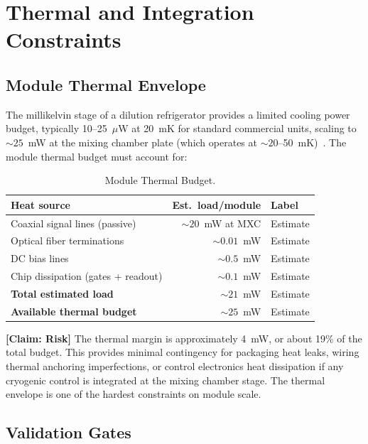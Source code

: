 \documentclass[conference]{IEEEtran}
\begin{document}
\section{Thermal and Integration Constraints}

\subsection{Module Thermal Envelope}

The millikelvin stage of a dilution refrigerator provides a limited cooling power budget, typically 10--25~$\mu$W at 20~mK for standard commercial units, scaling to ${\sim}25$~mW at the mixing chamber plate (which operates at ${\sim}20$--50~mK)~\cite{krinner2019}. The module thermal budget must account for:

\begin{table}[htbp]
\centering
\caption{Module Thermal Budget.}
\label{tab:thermal}
\begin{tabular}{lrl}
\toprule
\textbf{Heat source} & \textbf{Est.\ load/module} & \textbf{Label} \\
\midrule
Coaxial signal lines (passive) & ${\sim}20$~mW at MXC & Estimate \\
Optical fiber terminations & ${\sim}0.01$~mW & Estimate \\
DC bias lines & ${\sim}0.5$~mW & Estimate \\
Chip dissipation (gates + readout) & ${\sim}0.1$~mW & Estimate \\
\textbf{Total estimated load} & ${\sim}21$~mW & Estimate \\
\textbf{Available thermal budget} & ${\sim}25$~mW & Estimate \\
\bottomrule
\end{tabular}
\end{table}

\textbf{[Claim: Risk]} The thermal margin is approximately 4~mW, or about 19\% of the total budget. This provides minimal contingency for packaging heat leaks, wiring thermal anchoring imperfections, or control electronics heat dissipation if any cryogenic control is integrated at the mixing chamber stage. The thermal envelope is one of the hardest constraints on module scale.

\subsection{Validation Gates}
\end{document}
